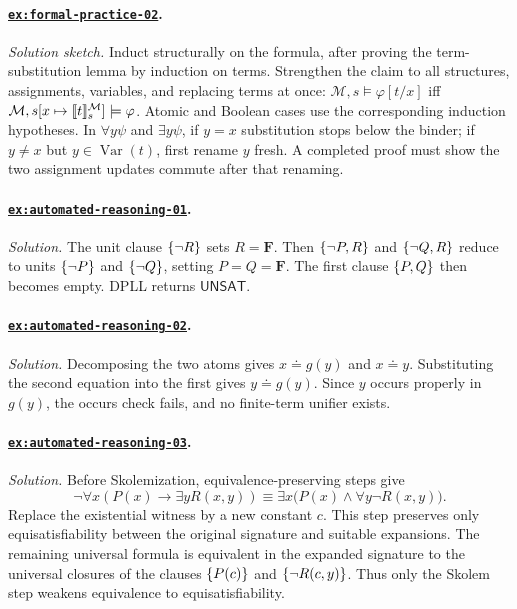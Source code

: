 \documentclass[11pt,oneside,openany]{book}
\theoremstyle{definition}
\theoremstyle{plain}
\theoremstyle{remark}
\DeclarePairedDelimiter{\set}{\lbrace}{\rbrace}
\DeclarePairedDelimiter{\sem}{\llbracket}{\rrbracket}
\newcommand{\entails}{\models}
\newcommand{\False}{\mathbf{F}}
\newcommand{\UNSAT}{\mathsf{UNSAT}}
\begin{document}
\paragraph{\hyperref[ex:formal-practice-02]{\texttt{ex:formal-practice-02}}.}
\textit{Solution sketch.}  Induct structurally on the formula, after proving
the term-substitution lemma by induction on terms.  Strengthen the claim to all
structures, assignments, variables, and replacing terms at once:
\(\mathcal M,s\entails\varphi[t/x]\) iff
\(\mathcal M,s[x\mapsto\sem{t}^{\mathcal M}_s]\entails\varphi\).  Atomic and
Boolean cases use the corresponding induction hypotheses.  In
\(\forall y\psi\) and \(\exists y\psi\), if \(y=x\) substitution stops below
the binder; if \(y\ne x\) but \(y\in\operatorname{Var}(t)\), first rename
\(y\) fresh.  A
completed proof must show the two assignment updates commute after that
renaming.

\paragraph{\hyperref[ex:automated-reasoning-01]{\texttt{ex:automated-reasoning-01}}.}
\textit{Solution.}  The unit clause \(\set{\neg R}\) sets \(R=\False\).
Then \(\set{\neg P,R}\) and \(\set{\neg Q,R}\) reduce to units
\(\set{\neg P}\) and \(\set{\neg Q}\), setting \(P=Q=\False\).  The first
clause \(\set{P,Q}\) then becomes empty.  DPLL returns \(\UNSAT\).

\paragraph{\hyperref[ex:automated-reasoning-02]{\texttt{ex:automated-reasoning-02}}.}
\textit{Solution.}  Decomposing the two atoms gives
\(x\doteq g(y)\) and \(x\doteq y\).  Substituting the second equation into the
first gives \(y\doteq g(y)\).  Since \(y\) occurs properly in \(g(y)\), the
occurs check fails, and no finite-term unifier exists.

\paragraph{\hyperref[ex:automated-reasoning-03]{\texttt{ex:automated-reasoning-03}}.}
\textit{Solution.}  Before Skolemization, equivalence-preserving steps give
\[
\neg\forall x(P(x)\to\exists yR(x,y))
\equiv\exists x\bigl(P(x)\land\forall y\neg R(x,y)\bigr).
\]
Replace the existential witness by a new constant \(c\).  This step preserves
only equisatisfiability between the original signature and suitable expansions.
The remaining universal formula is equivalent in the expanded signature to the
universal closures of the clauses \(\set{P(c)}\) and
\(\set{\neg R(c,y)}\).  Thus only the Skolem step weakens equivalence to
equisatisfiability.
\end{document}

